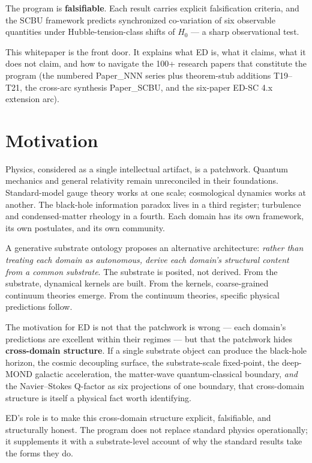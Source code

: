 \documentclass[11pt,a4paper]{article}
\begin{document}
The program is \textbf{falsifiable}. Each result carries explicit falsification criteria, and the SCBU framework predicts synchronized co-variation of six observable quantities under Hubble-tension-class shifts of $H_0$ --- a sharp observational test.

This whitepaper is the front door. It explains what ED is, what it claims, what it does not claim, and how to navigate the 100+ research papers that constitute the program (the numbered Paper\_NNN series plus theorem-stub additions T19--T21, the cross-arc synthesis Paper\_SCBU, and the six-paper ED-SC 4.x extension arc).

\section{Motivation}

Physics, considered as a single intellectual artifact, is a patchwork. Quantum mechanics and general relativity remain unreconciled in their foundations. Standard-model gauge theory works at one scale; cosmological dynamics works at another. The black-hole information paradox lives in a third register; turbulence and condensed-matter rheology in a fourth. Each domain has its own framework, its own postulates, and its own community.

A generative substrate ontology proposes an alternative architecture: \emph{rather than treating each domain as autonomous, derive each domain's structural content from a common substrate}. The substrate is posited, not derived. From the substrate, dynamical kernels are built. From the kernels, coarse-grained continuum theories emerge. From the continuum theories, specific physical predictions follow.

The motivation for ED is not that the patchwork is wrong --- each domain's predictions are excellent within their regimes --- but that the patchwork hides \textbf{cross-domain structure}. If a single substrate object can produce the black-hole horizon, the cosmic decoupling surface, the substrate-scale fixed-point, the deep-MOND galactic acceleration, the matter-wave quantum-classical boundary, \emph{and} the Navier--Stokes Q-factor as six projections of one boundary, that cross-domain structure is itself a physical fact worth identifying.

ED's role is to make this cross-domain structure explicit, falsifiable, and structurally honest. The program does not replace standard physics operationally; it supplements it with a substrate-level account of why the standard results take the forms they do.
\end{document}
